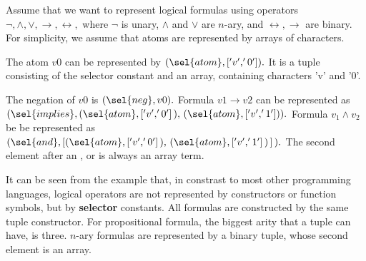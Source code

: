\begin{example}
   Assume that we want to represent logical formulas  
   using operators $ \neg, \wedge, \vee, \rightarrow, \leftrightarrow, $ 
   where $ \neg $ is unary, $ \wedge $ and $ \vee $ are $ n $-ary, 
   and $ \leftrightarrow,\rightarrow $ are binary.
   For simplicity, we assume that atoms are represented
   by arrays of characters.

   The atom $ v0 $ can be represented by
   $ ( \sel{atom}, [ 'v', '0' ] ). $ 
   It is a tuple consisting of the selector constant
    and an array, containing characters 'v' and '0'.
   
   The negation of $ v0 $ is $ ( \sel{neg}, v0 ). $ 
   Formula $ v1 \rightarrow v2 $ can be represented as
   $ ( \sel{implies}, ( \sel{atom}, [ 'v', '0' ] \, ), \,
                      ( \sel{atom}, [ 'v', '1' ] )). $ 
   Formula $ v_1 \wedge v_2 $ be be represented as
   $ ( \sel{and}, [ ( \sel{atom}, [ 'v', '0' ] \, ), \, 
                    ( \sel{atom}, [ 'v', '1' ] \, ) \, ] \, ). $ 
   The second element after an , or  is always an
   array term. 
\end{example}
It can be seen from the example that, in constrast to most other
programming languages, logical operators are not represented by
constructors or function symbols, but by 
{\bf selector} constants. All formulas are constructed by
the same tuple constructor. For propositional formula,
the biggest arity that a tuple
can have, is three.
$ n $-ary formulas are represented by a binary tuple, whose
second element is an array.

